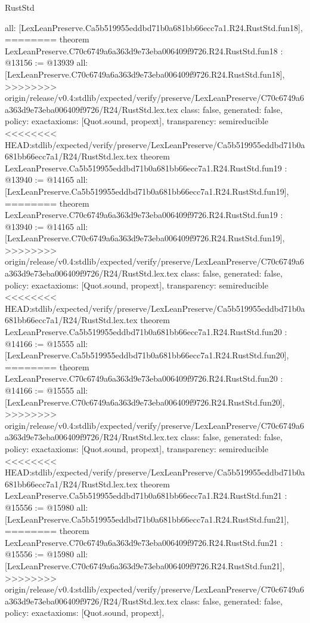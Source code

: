 \begin{lexlean}{RustStd}
\begin{coremodule}
{\begin{coremodule}
{{{{{{{{{{{{{{{{{{{{{  all: [LexLeanPreserve.Ca5b519955eddbd71b0a681bb66ecc7a1.R24.RustStd.fun18],
========
theorem LexLeanPreserve.C70c6749a6a363d9e73eba006409f9726.R24.RustStd.fun18 : @13156 := @13939 {
  all: [LexLeanPreserve.C70c6749a6a363d9e73eba006409f9726.R24.RustStd.fun18],
>>>>>>>> origin/release/v0.4:stdlib/expected/verify/preserve/LexLeanPreserve/C70c6749a6a363d9e73eba006409f9726/R24/RustStd.lex.tex
  class: false,
  generated: false,
  policy: exact{axioms: [Quot.sound, propext]},
  transparency: semireducible
}
<<<<<<<< HEAD:stdlib/expected/verify/preserve/LexLeanPreserve/Ca5b519955eddbd71b0a681bb66ecc7a1/R24/RustStd.lex.tex
theorem LexLeanPreserve.Ca5b519955eddbd71b0a681bb66ecc7a1.R24.RustStd.fun19 : @13940 := @14165 {
  all: [LexLeanPreserve.Ca5b519955eddbd71b0a681bb66ecc7a1.R24.RustStd.fun19],
========
theorem LexLeanPreserve.C70c6749a6a363d9e73eba006409f9726.R24.RustStd.fun19 : @13940 := @14165 {
  all: [LexLeanPreserve.C70c6749a6a363d9e73eba006409f9726.R24.RustStd.fun19],
>>>>>>>> origin/release/v0.4:stdlib/expected/verify/preserve/LexLeanPreserve/C70c6749a6a363d9e73eba006409f9726/R24/RustStd.lex.tex
  class: false,
  generated: false,
  policy: exact{axioms: [Quot.sound, propext]},
  transparency: semireducible
}
<<<<<<<< HEAD:stdlib/expected/verify/preserve/LexLeanPreserve/Ca5b519955eddbd71b0a681bb66ecc7a1/R24/RustStd.lex.tex
theorem LexLeanPreserve.Ca5b519955eddbd71b0a681bb66ecc7a1.R24.RustStd.fun20 : @14166 := @15555 {
  all: [LexLeanPreserve.Ca5b519955eddbd71b0a681bb66ecc7a1.R24.RustStd.fun20],
========
theorem LexLeanPreserve.C70c6749a6a363d9e73eba006409f9726.R24.RustStd.fun20 : @14166 := @15555 {
  all: [LexLeanPreserve.C70c6749a6a363d9e73eba006409f9726.R24.RustStd.fun20],
>>>>>>>> origin/release/v0.4:stdlib/expected/verify/preserve/LexLeanPreserve/C70c6749a6a363d9e73eba006409f9726/R24/RustStd.lex.tex
  class: false,
  generated: false,
  policy: exact{axioms: [Quot.sound, propext]},
  transparency: semireducible
}
<<<<<<<< HEAD:stdlib/expected/verify/preserve/LexLeanPreserve/Ca5b519955eddbd71b0a681bb66ecc7a1/R24/RustStd.lex.tex
theorem LexLeanPreserve.Ca5b519955eddbd71b0a681bb66ecc7a1.R24.RustStd.fun21 : @15556 := @15980 {
  all: [LexLeanPreserve.Ca5b519955eddbd71b0a681bb66ecc7a1.R24.RustStd.fun21],
========
theorem LexLeanPreserve.C70c6749a6a363d9e73eba006409f9726.R24.RustStd.fun21 : @15556 := @15980 {
  all: [LexLeanPreserve.C70c6749a6a363d9e73eba006409f9726.R24.RustStd.fun21],
>>>>>>>> origin/release/v0.4:stdlib/expected/verify/preserve/LexLeanPreserve/C70c6749a6a363d9e73eba006409f9726/R24/RustStd.lex.tex
  class: false,
  generated: false,
  policy: exact{axioms: [Quot.sound, propext]},
}}}}}}}}}}}}}}}}}}}}}}}}}
\end{coremodule}}
\end{coremodule}
\end{lexlean}

